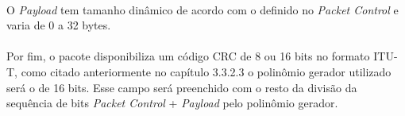 \paragraph{} O \textit{Payload} tem tamanho dinâmico de acordo com o definido no \textit{Packet Control} e varia de 0 a 32 bytes.

\paragraph{} Por fim, o pacote disponibiliza um código CRC de 8 ou 16 bits no formato ITU-T, como citado anteriormente no capítulo 3.3.2.3 o polinômio gerador utilizado será o de 16 bits. Esse campo será preenchido com o resto da divisão da sequência de bits \textit{Packet Control} + \textit{Payload} pelo polinômio gerador.